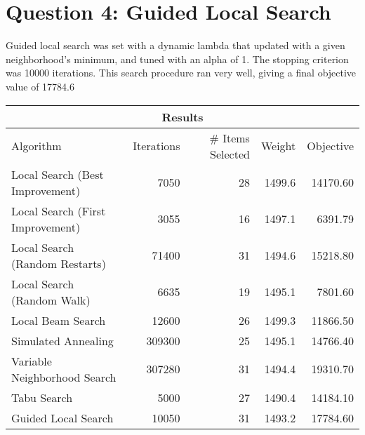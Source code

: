 \documentclass[12pt, letterpaper]{article}
\begin{document}
\section*{Question 4: Guided Local Search}
Guided local search was set with a dynamic lambda that updated with a given neighborhood's minimum, and tuned with an alpha of 1. The stopping criterion was 10000 iterations. This search procedure ran very well, giving a final objective value of 17784.6

\begin{center}
\begin{tabular}{ l r r r r } 

 \multicolumn{5}{c}{Results} \\
 \hline
Algorithm & Iterations & \# Items Selected & Weight & Objective \\
 \hline 
Local Search (Best Improvement) & 7050 & 28 & 1499.6 & 14170.60 \\
Local Search (First Improvement) & 3055 & 16 & 1497.1 & 6391.79\\
Local Search (Random Restarts) & 71400 & 31 & 1494.6 & 15218.80\\
Local Search (Random Walk) & 6635 & 19 & 1495.1 & 7801.60\\
Local Beam Search & 12600 & 26 & 1499.3 & 11866.50\\
Simulated Annealing & 309300 & 25 & 1495.1 & 14766.40\\
Variable Neighborhood Search & 307280 & 31 & 1494.4 &  19310.70\\
Tabu Search & 5000 & 27 & 1490.4 & 14184.10\\
Guided Local Search &  10050 & 31 & 1493.2 & 17784.60\\
 \hline
\end{tabular}
\end{center}
\end{document}
